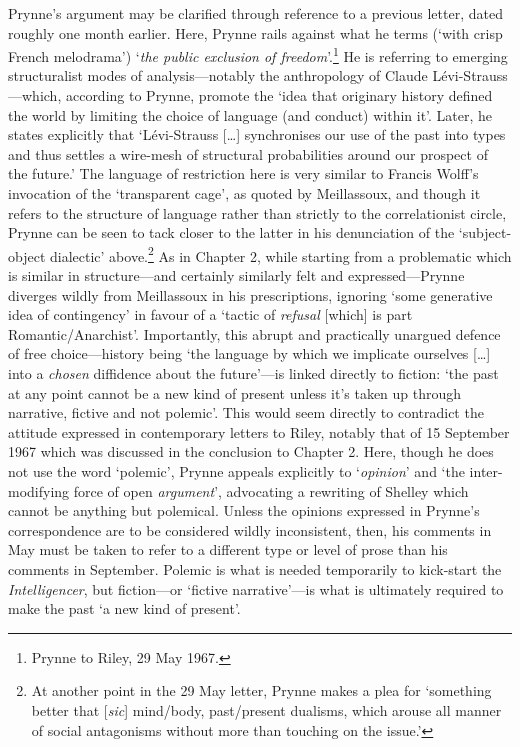 \documentclass[]{article}
\begin{document}
Prynne's argument may be clarified through reference to a previous
letter, dated roughly one month earlier. Here, Prynne rails against what
he terms (`with crisp French melodrama') `\emph{the public exclusion of
freedom}'.\footnote{Prynne to Riley, 29 May 1967.} He is referring to
emerging structuralist modes of analysis---notably the anthropology of
Claude Lévi-Strauss---which, according to Prynne, promote the `idea that
originary history defined the world by limiting the choice of language
(and conduct) within it'. Later, he states explicitly that `Lévi-Strauss
{[}\ldots{}{]} synchronises our use of the past into types and thus
settles a wire-mesh of structural probabilities around our prospect of
the future.' The language of restriction here is very similar to Francis
Wolff's invocation of the `transparent cage', as quoted by Meillassoux,
and though it refers to the structure of language rather than strictly
to the correlationist circle, Prynne can be seen to tack closer to the
latter in his denunciation of the `subject-object dialectic'
above.\footnote{At another point in the 29 May letter, Prynne makes a
  plea for `something better that {[}\emph{sic}{]} mind/body,
  past/present dualisms, which arouse all manner of social antagonisms
  without more than touching on the issue.'} As in Chapter 2, while
starting from a problematic which is similar in structure---and
certainly similarly felt and expressed---Prynne diverges wildly from
Meillassoux in his prescriptions, ignoring `some generative idea of
contingency' in favour of a `tactic of \emph{refusal} {[}which{]} is
part Romantic/Anarchist'. Importantly, this abrupt and practically
unargued defence of free choice---history being `the language by which
we implicate ourselves {[}\ldots{}{]} into a \emph{chosen} diffidence
about the future'---is linked directly to fiction: `the past at any
point cannot be a new kind of present unless it's taken up through
narrative, fictive and not polemic'. This would seem directly to
contradict the attitude expressed in contemporary letters to Riley,
notably that of 15 September 1967 which was discussed in the conclusion
to Chapter 2. Here, though he does not use the word `polemic', Prynne
appeals explicitly to `\emph{opinion}' and `the inter-modifying force of
open \emph{argument}', advocating a rewriting of Shelley which cannot be
anything but polemical. Unless the opinions expressed in Prynne's
correspondence are to be considered wildly inconsistent, then, his
comments in May must be taken to refer to a different type or level of
prose than his comments in September. Polemic is what is needed
temporarily to kick-start the \emph{Intelligencer}, but fiction---or
`fictive narrative'---is what is ultimately required to make the past `a
new kind of present'.
\end{document}
